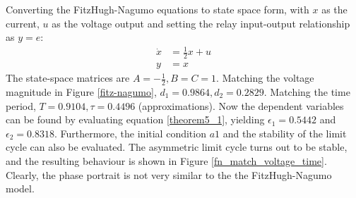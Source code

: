 \documentclass[a4paper]{article}
\begin{document}
Converting the FitzHugh-Nagumo equations to state space form, with $x$ as the current,  $u$ as the voltage output and setting the relay input-output relationship as $y = e$:
\begin{align}
\dot{x} &= \tfrac{1}{2}x + u \\
y &= x
\end{align}
The state-space matrices are $A = -\tfrac{1}{2}, B = C = 1$. Matching the voltage magnitude in Figure \ref{fitz-nagumo}, $d_1 = 0.9864, d_2 = 0.2829$. Matching the time period, $T = 0.9104, \tau = 0.4496$ (approximations). Now the dependent variables can be found by evaluating equation \ref{theorem5_1}, yielding $\epsilon_1 = 0.5442$ and $\epsilon_2 = 0.8318$. Furthermore, the initial condition $a1$ and the stability of the limit cycle can also be evaluated. The asymmetric limit cycle turns out to be stable, and the resulting behaviour is shown in Figure \ref{fn_match_voltage_time}. Clearly, the phase portrait is not very similar to the the FitzHugh-Nagumo model.
\end{document}
